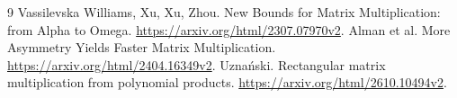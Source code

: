 \documentclass[11pt]{article}
\begin{document}
\begin{thebibliography}{9}
 Vassilevska Williams, Xu, Xu, Zhou.
New Bounds for Matrix Multiplication: from Alpha to Omega.
\url{https://arxiv.org/html/2307.07970v2}.
 Alman et al. More Asymmetry Yields Faster Matrix Multiplication.
\url{https://arxiv.org/html/2404.16349v2}.
 Uzna\'nski. Rectangular matrix multiplication from polynomial products.
\url{https://arxiv.org/html/2610.10494v2}.
\end{thebibliography}
\end{document}
